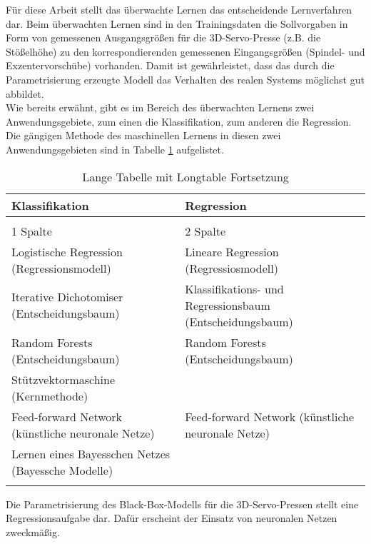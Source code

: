 Für diese Arbeit stellt das überwachte Lernen das entscheidende Lernverfahren dar. Beim überwachten Lernen sind in den Trainingsdaten die Sollvorgaben in Form von gemessenen Ausgangsgrößen für die 3D-Servo-Presse (z.B. die Stößelhöhe) zu den korrespondierenden gemessenen Eingangsgrößen (Spindel- und Exzentervorschübe) vorhanden. Damit ist gewährleistet, dass das durch die Parametrisierung erzeugte Modell das Verhalten des realen Systems möglichst gut abbildet. \\
Wie bereits erwähnt, gibt es im Bereich des überwachten Lernens zwei Anwendungsgebiete, zum einen die Klassifikation, zum anderen die Regression. Die gängigen Methode des maschinellen Lernens in diesen zwei Anwendungsgebieten sind in Tabelle \ref{tab:machine_learning} aufgelistet.

\begin{longtable}{p{7.5cm} p{7.5cm}}
	\caption{Methoden des maschinellen Lernens im Bereich Klassifikation und Regression} \\ \toprule
	\textbf{Klassifikation} & \textbf{Regression} \\
	\hline
	\endfirsthead %
	\caption{Lange Tabelle mit Longtable Fortsetzung}\\
	1 Spalte & 2 Spalte\\
	\hline
	\endhead %
	\hline
	
	Logistische Regression (Regressionsmodell) & Lineare Regression (Regressiosmodell)\\ \hline
	Iterative Dichotomiser (Entscheidungsbaum) & Klassifikations- und Regressionsbaum (Entscheidungsbaum) \\ \hline
	Random Forests (Entscheidungsbaum) & Random Forests (Entscheidungsbaum) \\ \hline
	Stützvektormaschine (Kernmethode) & \\ \hline
	Feed-forward Network (künstliche neuronale Netze) & Feed-forward Network (künstliche neuronale Netze) \\ \hline
	Lernen eines Bayesschen Netzes (Bayessche Modelle) & \\ 
	
	 \bottomrule
	\label{tab:machine_learning} 
\end{longtable}  

Die Parametrisierung des Black-Box-Modells für die 3D-Servo-Pressen stellt eine Regressionsaufgabe dar. Dafür erscheint der Einsatz von neuronalen Netzen zweckmäßig.  






